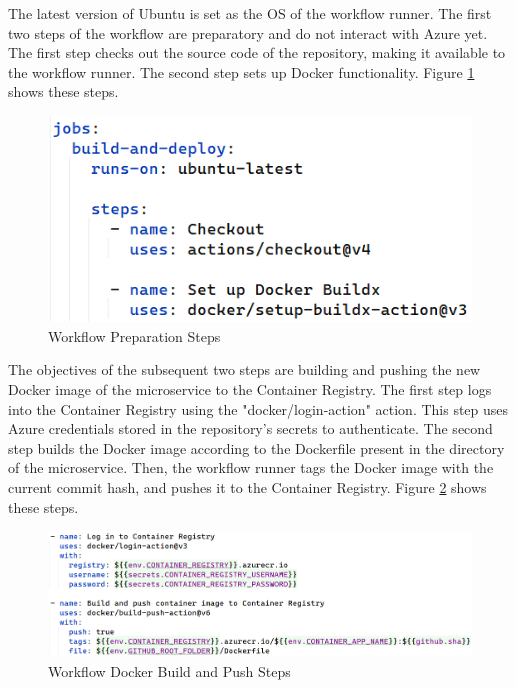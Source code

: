 \documentclass[12pt, reqno, oneside]{amsbook}
\theoremstyle{definition}
\theoremstyle{definition}
\numberwithin{section}{chapter}
\numberwithin{table}{chapter}
\numberwithin{figure}{chapter}
\begin{document}
The latest version of Ubuntu is set as the \ac{OS} of the workflow runner. The first two steps of the workflow are preparatory and do not interact with Azure yet. The first step checks out the source code of the repository, making it available to the workflow runner. The second step sets up Docker functionality. Figure \ref{Figure:GithubWorkflowPreparation} shows these steps.

\begin{figure}[H]
  \centering
  \includegraphics[width=0.7\linewidth]{images/GithubWorkflowPreparation.png}
  \caption{\label{Figure:GithubWorkflowPreparation}Workflow Preparation Steps}
\end{figure}

\pagebreak

The objectives of the subsequent two steps are building and pushing the new Docker image of the microservice to the Container Registry. The first step logs into the Container Registry using the "docker/login-action" action. This step uses Azure credentials stored in the repository's secrets to authenticate. The second step builds the Docker image according to the Dockerfile present in the directory of the microservice. Then, the workflow runner tags the Docker image with the current commit hash, and pushes it to the Container Registry. Figure \ref{Figure:GithubWorkflowContainerRegistry} shows these steps.

\begin{figure}[H]
  \centering
  \includegraphics[width=1\linewidth]{images/GithubWorkflowContainerRegistry.png}
  \caption{\label{Figure:GithubWorkflowContainerRegistry}Workflow Docker Build and Push Steps}
\end{figure}
\end{document}
